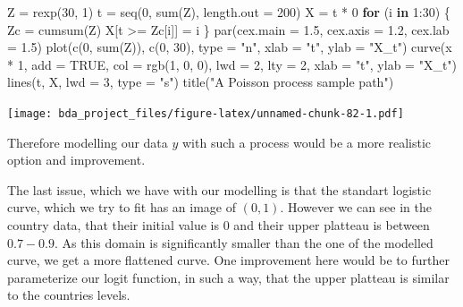 \documentclass[
]{article}
\newenvironment{Shaded}{\begin{snugshade}}{\end{snugshade}}
\newcommand{\AttributeTok}[1]{\textcolor[rgb]{0.77,0.63,0.00}{#1}}
\newcommand{\ConstantTok}[1]{\textcolor[rgb]{0.00,0.00,0.00}{#1}}
\newcommand{\ControlFlowTok}[1]{\textcolor[rgb]{0.13,0.29,0.53}{\textbf{#1}}}
\newcommand{\DecValTok}[1]{\textcolor[rgb]{0.00,0.00,0.81}{#1}}
\newcommand{\FloatTok}[1]{\textcolor[rgb]{0.00,0.00,0.81}{#1}}
\newcommand{\FunctionTok}[1]{\textcolor[rgb]{0.00,0.00,0.00}{#1}}
\newcommand{\NormalTok}[1]{#1}
\newcommand{\OtherTok}[1]{\textcolor[rgb]{0.56,0.35,0.01}{#1}}
\newcommand{\SpecialCharTok}[1]{\textcolor[rgb]{0.00,0.00,0.00}{#1}}
\newcommand{\StringTok}[1]{\textcolor[rgb]{0.31,0.60,0.02}{#1}}
\begin{document}
\begin{Shaded}
\begin{Highlighting}[]
\NormalTok{Z }\OtherTok{=} \FunctionTok{rexp}\NormalTok{(}\DecValTok{30}\NormalTok{, }\DecValTok{1}\NormalTok{)}
\NormalTok{t }\OtherTok{=} \FunctionTok{seq}\NormalTok{(}\DecValTok{0}\NormalTok{, }\FunctionTok{sum}\NormalTok{(Z), }\AttributeTok{length.out =} \DecValTok{200}\NormalTok{)}
\NormalTok{X }\OtherTok{=}\NormalTok{ t }\SpecialCharTok{*} \DecValTok{0}
\ControlFlowTok{for}\NormalTok{ (i }\ControlFlowTok{in} \DecValTok{1}\SpecialCharTok{:}\DecValTok{30}\NormalTok{) \{}
\NormalTok{    Zc }\OtherTok{=} \FunctionTok{cumsum}\NormalTok{(Z)}
\NormalTok{    X[t }\SpecialCharTok{\textgreater{}=}\NormalTok{ Zc[i]] }\OtherTok{=}\NormalTok{ i}
\NormalTok{\}}
\FunctionTok{par}\NormalTok{(}\AttributeTok{cex.main =} \FloatTok{1.5}\NormalTok{, }\AttributeTok{cex.axis =} \FloatTok{1.2}\NormalTok{, }\AttributeTok{cex.lab =} \FloatTok{1.5}\NormalTok{)}
\FunctionTok{plot}\NormalTok{(}\FunctionTok{c}\NormalTok{(}\DecValTok{0}\NormalTok{, }\FunctionTok{sum}\NormalTok{(Z)), }\FunctionTok{c}\NormalTok{(}\DecValTok{0}\NormalTok{, }\DecValTok{30}\NormalTok{), }\AttributeTok{type =} \StringTok{"n"}\NormalTok{, }\AttributeTok{xlab =} \StringTok{"t"}\NormalTok{,}
    \AttributeTok{ylab =} \StringTok{"X\_t"}\NormalTok{)}
\FunctionTok{curve}\NormalTok{(x }\SpecialCharTok{*} \DecValTok{1}\NormalTok{, }\AttributeTok{add =} \ConstantTok{TRUE}\NormalTok{, }\AttributeTok{col =} \FunctionTok{rgb}\NormalTok{(}\DecValTok{1}\NormalTok{, }\DecValTok{0}\NormalTok{, }\DecValTok{0}\NormalTok{), }\AttributeTok{lwd =} \DecValTok{2}\NormalTok{,}
    \AttributeTok{lty =} \DecValTok{2}\NormalTok{, }\AttributeTok{xlab =} \StringTok{"t"}\NormalTok{, }\AttributeTok{ylab =} \StringTok{"X\_t"}\NormalTok{)}
\FunctionTok{lines}\NormalTok{(t, X, }\AttributeTok{lwd =} \DecValTok{3}\NormalTok{, }\AttributeTok{type =} \StringTok{"s"}\NormalTok{)}
\FunctionTok{title}\NormalTok{(}\StringTok{"A Poisson process sample path"}\NormalTok{)}
\end{Highlighting}
\end{Shaded}

\texttt{[image: bda\_project\_files/figure-latex/unnamed-chunk-82-1.pdf]}

Therefore modelling our data \(y\) with such a process would be a more
realistic option and improvement.

The last issue, which we have with our modelling is that the standart
logistic curve, which we try to fit has an image of \((0,1)\). However
we can see in the country data, that their initial value is \(0\) and
their upper platteau is between \(0.7-0.9\). As this domain is
significantly smaller than the one of the modelled curve, we get a more
flattened curve. One improvement here would be to further parameterize
our logit function, in such a way, that the upper platteau is similar to
the countries levels.
\end{document}
